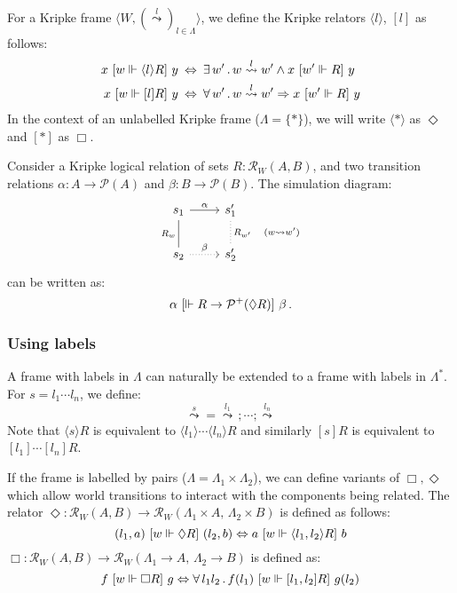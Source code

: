For a Kripke frame
$\langle W, (\stackrel{l}{\leadsto})_{l \in \Lambda} \rangle$,
we define the Kripke relators $\langle l \rangle$, $[l]$ as follows:
\begin{align*}
  x \ [{w \Vdash \langle l \rangle R}]\  y & \: \Leftrightarrow \:
    \exists \, w' \,.\, w \stackrel{l}{\leadsto} w' \wedge
      x \ [{w' \Vdash R}]\  y \\
  x \ [{w \Vdash [ l ] R}]\  y & \: \Leftrightarrow \:
    \forall \, w' \,.\, w \stackrel{l}{\leadsto} w' \Rightarrow
      x \ [{w' \Vdash R}]\  y
\end{align*}
In the context of an unlabelled Kripke frame ($\Lambda = \{ * \}$),
we will write $\langle * \rangle$ as $\Diamond$ and
$[ * ]$ as $\Box$.

\begin{example}
\label{ex:sim}
Consider a Kripke logical relation of sets $R : \mathcal{R}_W(A, B)$,
and two transition relations $\alpha : A \rightarrow \mathcal{P}(A)$
and $\beta : B \rightarrow \mathcal{P}(B)$.
The simulation diagram:
\[
  \begin{tikzcd}
    s_1 \arrow[r, "\alpha"]
        \arrow[d, dash, "R_w"'] &
    s_1' \arrow[d, dotted, dash, "R_{w'} \quad (w \leadsto w')"] \\
    s_2 \arrow[r, dotted, "\beta"] &
    s_2'
  \end{tikzcd}
\]
can be written as:
\[
  \alpha \ [{\Vdash R \rightarrow \mathcal{P}^+(\Diamond R)}]\  \beta \,.
\]
\end{example}

\subsubsection{Using labels}

A frame with labels in $\Lambda$
can naturally be extended to a frame with labels in $\Lambda^*$.
For $s = l_1 \cdots l_n$, we define:
\[
    {\stackrel{s}{\leadsto}} =
    {\stackrel{l_1}{\leadsto}} \, ; \cdots ; {\stackrel{l_n}{\leadsto}}
\]
Note that $\langle s \rangle R$ is equivalent to
$\langle l_1 \rangle \cdots \langle l_n \rangle R$
and similarly $[s] R$ is equivalent to
$[ l_1 ] \cdots [ l_n ] R$.

If the frame is labelled by pairs
($\Lambda = \Lambda_1 \times \Lambda_2$),
we can define variants of $\Box, \Diamond$ which
allow world transitions to interact with the components
being related.
The relator
$\Diamond : \mathcal{R}_W(A, B) \rightarrow
            \mathcal{R}_W(\Lambda_1 \times A, \, \Lambda_2 \times B)$
is defined as follows:
\[
  (l_1, a) \ [{w \Vdash \Diamond R}]\  (l_2, b) \Leftrightarrow
    a \ [{w \Vdash \langle l_1, l_2 \rangle R}]\  b
\]
$\Box : \mathcal{R}_W(A, B) \rightarrow
        \mathcal{R}_W(\Lambda_1 \rightarrow A, \, \Lambda_2 \rightarrow B)$
is defined as:
\[
  f \ [{w \Vdash \Box R}]\  g \Leftrightarrow
    \forall \, l_1 l_2 \,.\, f(l_1) \ [{w \Vdash [l_1, l_2] R}]\  g(l_2)
\]


